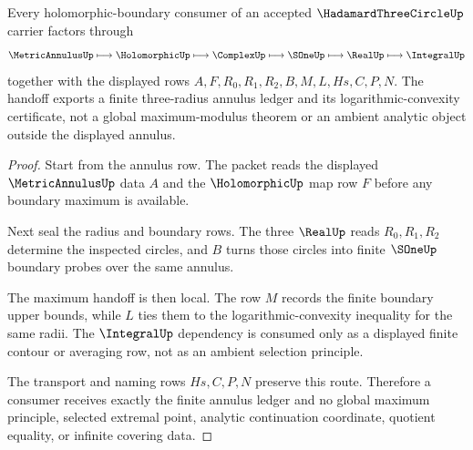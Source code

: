 \begin{theorem}
\label{thm:hadamard-three-circle-annulus-maximum-handoff}
Every holomorphic-boundary consumer of an accepted $\HadamardThreeCircleUp$ carrier factors through
$$
\MetricAnnulusUp \longmapsto \HolomorphicUp \longmapsto \ComplexUp \longmapsto \SOneUp \longmapsto \RealUp \longmapsto \IntegralUp
$$
together with the displayed rows $A,F,R_0,R_1,R_2,B,M,L,Hs,C,P,N$. The handoff exports a finite three-radius annulus ledger and its logarithmic-convexity certificate, not a global maximum-modulus theorem or an ambient analytic object outside the displayed annulus.
\end{theorem}
\begin{proof}
Start from the annulus row. The packet reads the displayed $\MetricAnnulusUp$ data $A$ and the $\HolomorphicUp$ map row $F$ before any boundary maximum is available.

Next seal the radius and boundary rows. The three $\RealUp$ reads $R_0,R_1,R_2$ determine the inspected circles, and $B$ turns those circles into finite $\SOneUp$ boundary probes over the same annulus.

The maximum handoff is then local. The row $M$ records the finite boundary upper bounds, while $L$ ties them to the logarithmic-convexity inequality for the same radii. The $\IntegralUp$ dependency is consumed only as a displayed finite contour or averaging row, not as an ambient selection principle.

The transport and naming rows $Hs,C,P,N$ preserve this route. Therefore a consumer receives exactly the finite annulus ledger and no global maximum principle, selected extremal point, analytic continuation coordinate, quotient equality, or infinite covering data.
\end{proof}

